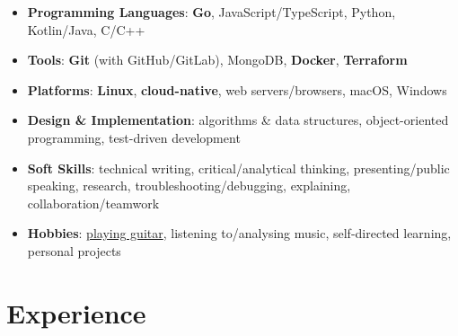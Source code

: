 \documentclass[
	a4paper,
	10pt,
	roman,
	colorlinks,
	linkcolor = purple,
	filecolor = purple,
	citecolor = blue,
	urlcolor = blue
]{moderncv}
\begin{document}

	\begin{itemize}
		\item \textbf{Programming Languages}: \textbf{Go}, JavaScript/TypeScript, Python, Kotlin/Java, C/C++
		\item \textbf{Tools}: \textbf{Git} (with GitHub/GitLab), MongoDB, \textbf{Docker}, \textbf{Terraform}
		\item \textbf{Platforms}: \textbf{Linux}, \textbf{cloud-native}, web servers/browsers, macOS, Windows
		\item \textbf{Design \& Implementation}: algorithms \& data structures, object-oriented programming, test-driven development
		\item \textbf{Soft Skills}: technical writing, critical/analytical thinking, presenting/public speaking, research, troubleshooting/debugging, explaining, collaboration/teamwork
		\item \textbf{Hobbies}: \href{https://applegamer22.github.io/about/#hobbies}{playing guitar}, listening to/analysing music, self-directed learning, personal projects
	\end{itemize}

	\section{Experience}
\end{document}

